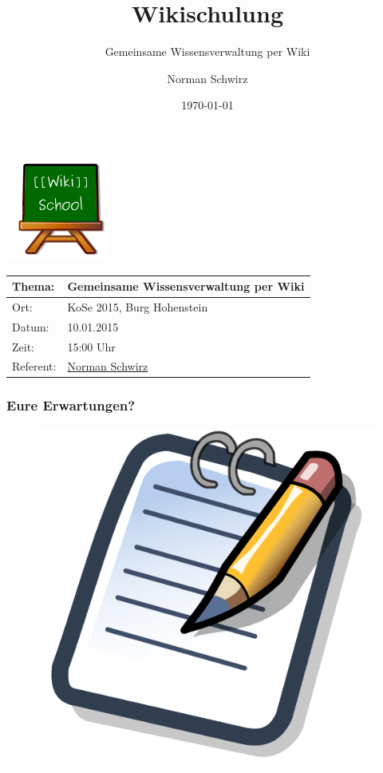 \documentclass[handout]{beamer}   %
\title{Wikischulung}
\subtitle{Gemeinsame Wissensverwaltung per Wiki}
\author{Norman Schwirz}
\institute{StuRa der HTW Dresden, Bereich Schulungen}
\date{\today}
\begin{document}
\begin{frame} %
  \begin{center}
    \includegraphics[keepaspectratio=true, scale=1]{wikischool-logo}
    \begin{longtable}{|l|l|}
      \toprule
      \textbf{Thema:} &  \textbf{Gemeinsame Wissensverwaltung per Wiki} \\
      \midrule
       Ort:           & KoSe 2015, Burg Hohenstein \\ 
       Datum:         & 10.01.2015 \\
       Zeit:          & 15:00 Uhr \\ 
       Referent:      &  \href{http://www.stura.htw-dresden.de/members/NormanSchwirz}{Norman Schwirz}  \\ 
      \bottomrule
    \end{longtable}
  \end{center}
\end{frame}


\begin{frame}
  \frametitle{Eure Erwartungen?}
  
  \begin{figure}[tbph]
    \centering
    \includegraphics[width=0.7\linewidth]{500px-Notepad_icon}
    \label{fig:500px-Notepad_icon}
  \end{figure}
  
\end{frame}
\end{document}
